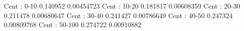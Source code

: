 Cent : 0-10
0.140952 0.00454723
Cent : 10-20
0.181817 0.00608359
Cent : 20-30
0.211478 0.00680647
Cent : 30-40
0.241427 0.00786649
Cent : 40-50
0.247324 0.00809768
Cent : 50-100
0.274722 0.00910882
